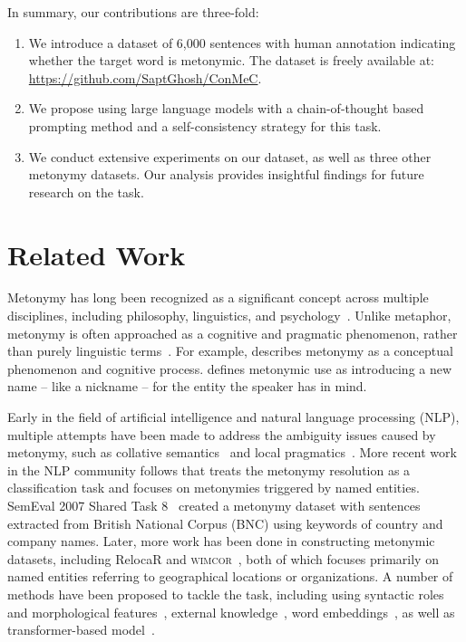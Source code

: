 \documentclass[11pt]{article}
\begin{document}
In summary, our contributions are three-fold:

\begin{enumerate}
    \item We introduce a dataset of 6,000 sentences with human annotation indicating whether the target word is metonymic. The dataset is freely available at: \url{https://github.com/SaptGhosh/ConMeC}.

    \item We propose using large language models with a chain-of-thought based prompting method and a self-consistency strategy for this task.

    \item We conduct extensive experiments on our dataset, as well as three other metonymy datasets. Our analysis provides insightful findings for future research on the task.
\end{enumerate}

\section{Related Work}
Metonymy has long been recognized as a significant concept across multiple disciplines,  including philosophy, linguistics, and psychology~\citep{noppen1985metaphor}. Unlike metaphor, metonymy is often approached as a cognitive and pragmatic phenomenon, rather than purely linguistic terms~\citep{maria2015metonymy}. For example, \citet{radden} describes metonymy as a conceptual phenomenon and cognitive process.  \citet{papafragou1996metonymy} defines metonymic use as introducing a new name – like a nickname – for the entity the speaker has in mind. 

Early in the field of artificial intelligence and natural language processing (NLP), multiple attempts have been made to address the ambiguity issues caused by metonymy, such as collative semantics~\citep{fass-1991-met} and local pragmatics~\citep{hobbs1987local}. More recent work in the NLP community follows \citet{markert-nissim-2002-metonymy} that treats the metonymy resolution as a classification task and focuses on metonymies triggered by named entities. SemEval 2007 Shared Task 8~\citep{markert-nissim-2007-semeval} created a metonymy dataset with sentences extracted from British National Corpus (BNC) using keywords of country and company
names. Later, more work has been done in constructing metonymic datasets, including RelocaR \citep{gritta-etal-2017-vancouver} and \textsc{wimcor}~\citep{alex-mathews-strube-2020-large}, both of which focuses primarily on named entities referring to geographical locations or organizations. A number of methods have been proposed to tackle the task, including using syntactic roles and morphological features~\citep{nicolae-etal-2007-utd}, external knowledge~\citep{nastase-strube-2009-combining}, word embeddings~\citep{gritta-etal-2017-vancouver}, as well as transformer-based model~\citep{li-etal-2020-target}.
\end{document}
